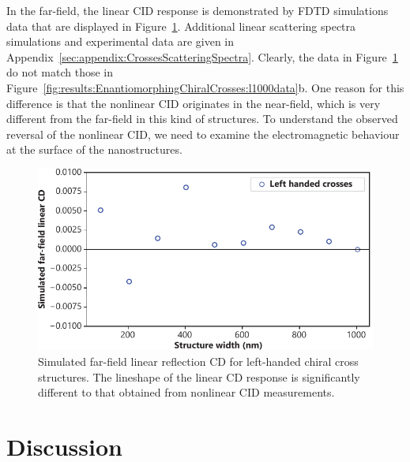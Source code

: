 In the far-field, the linear CID response is demonstrated by FDTD simulations data that are displayed in Figure~\ref{fig:results:EnantiomorphingChiralCrosses:reflectionsim}. Additional linear scattering spectra simulations and experimental data are given in Appendix~\ref{sec:appendix:CrossesScatteringSpectra}. Clearly, the data in Figure~\ref{fig:results:EnantiomorphingChiralCrosses:reflectionsim} do not match those in Figure~\ref{fig:results:EnantiomorphingChiralCrosses:l1000data}b. One reason for this difference is that the nonlinear CID originates in the near-field, which is very different from the far-field in this kind of structures. To understand the observed reversal of the nonlinear CID, we need to examine the electromagnetic behaviour at the surface of the nanostructures. 

\begin{figure}[htb!]	
    \centering	
    \includegraphics[scale=1]{./figures/results/EnantiomorphingChiralCrosses/reflection_sim.pdf}
    \caption{\label{fig:results:EnantiomorphingChiralCrosses:reflectionsim}
    Simulated far-field linear reflection CD for left-handed chiral cross structures. The lineshape of the linear CD response is significantly different to that obtained from nonlinear CID measurements.}	
\end{figure}

\section{Discussion}\label{sec:results:EnantiomorphingChiralCrosses:discussion}

